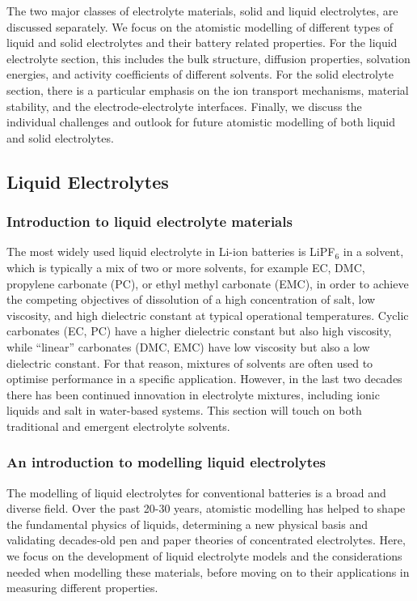 \documentclass[../main.tex]{subfiles}
\begin{document}
The two major classes of electrolyte materials, solid and liquid electrolytes, are discussed separately. We focus on the atomistic modelling of different types of liquid and solid electrolytes and their battery related properties. For the liquid electrolyte section, this includes the bulk structure, diffusion properties, solvation energies, and activity coefficients of different solvents. For the solid electrolyte section, there is a particular emphasis on the ion transport mechanisms, material stability, and the electrode-electrolyte interfaces. Finally, we discuss the individual challenges and outlook for future atomistic modelling of both liquid and solid electrolytes.

\subsection{Liquid Electrolytes}
\label{sec:Liquid_electrolytes}
\subsubsection{Introduction to liquid electrolyte materials}
The most widely used liquid electrolyte in Li-ion batteries is LiPF$_6$ in a solvent, which is typically a mix of two or more solvents, for example EC, DMC, propylene carbonate (PC), or ethyl methyl carbonate (EMC), in order to achieve the competing objectives of dissolution of a high concentration of salt, low viscosity, and high dielectric constant at typical operational temperatures.\cite{Xu2004,Xu2014, Logan2020, Valo_en_2005,TARASCON19931221} Cyclic carbonates (EC, PC) have a higher dielectric constant but also high viscosity, while ``linear'' carbonates (DMC, EMC) have low viscosity but also a low dielectric constant. For that reason, mixtures of solvents are often used to optimise performance in a specific application.\cite{Logan2020,Yamada_2013,TARASCON19931221} However, in the last two decades there has been continued innovation in electrolyte mixtures, including ionic liquids\cite{macfarlane2014energy} and salt in water-based systems.\cite{suo2016advanced} This section will touch on both traditional and emergent electrolyte solvents.

\subsubsection{An introduction to modelling liquid electrolytes}
The modelling of liquid electrolytes for conventional batteries is a broad and diverse field. Over the past 20-30 years, atomistic modelling has helped to shape the fundamental physics of liquids, determining a new physical basis and validating decades-old pen and paper theories of concentrated electrolytes.\cite{qian2015high,kim2015situ,zhou2009atomistic,enderby1981structure} Here, we focus on the development of liquid electrolyte models and the considerations needed when modelling these materials, before moving on to their applications in measuring different properties.
\end{document}
